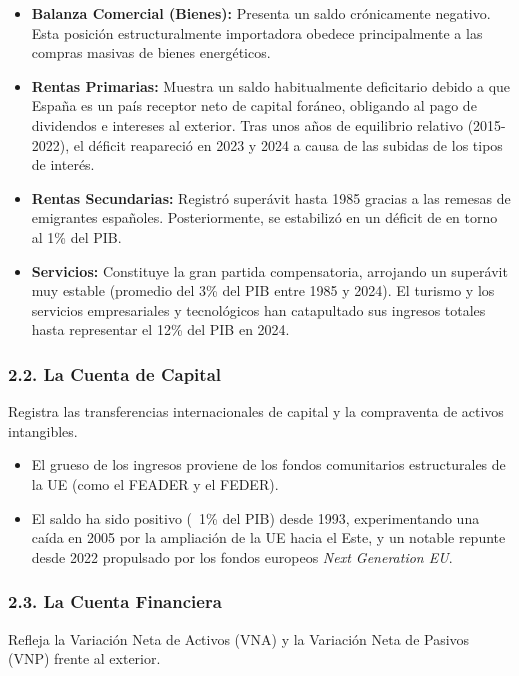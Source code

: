 \begin{itemize}
  \item \textbf{Balanza Comercial (Bienes):} Presenta un saldo crónicamente negativo. Esta posición estructuralmente importadora obedece principalmente a las compras masivas de bienes energéticos.
  \item \textbf{Rentas Primarias:} Muestra un saldo habitualmente deficitario debido a que España es un país receptor neto de capital foráneo, obligando al pago de dividendos e intereses al exterior. Tras unos años de equilibrio relativo (2015-2022), el déficit reapareció en 2023 y 2024 a causa de las subidas de los tipos de interés.
  \item \textbf{Rentas Secundarias:} Registró superávit hasta 1985 gracias a las remesas de emigrantes españoles. Posteriormente, se estabilizó en un déficit de en torno al 1\% del PIB.
  \item \textbf{Servicios:} Constituye la gran partida compensatoria, arrojando un superávit muy estable (promedio del 3\% del PIB entre 1985 y 2024). El turismo y los servicios empresariales y tecnológicos han catapultado sus ingresos totales hasta representar el 12\% del PIB en 2024.
\end{itemize}

\subsubsection*{2.2. La Cuenta de Capital}

Registra las transferencias internacionales de capital y la compraventa de activos intangibles.

\begin{itemize}
  \item El grueso de los ingresos proviene de los fondos comunitarios estructurales de la UE (como el FEADER y el FEDER).
  \item El saldo ha sido positivo (~1\% del PIB) desde 1993, experimentando una caída en 2005 por la ampliación de la UE hacia el Este, y un notable repunte desde 2022 propulsado por los fondos europeos \textit{Next Generation EU}.
\end{itemize}

\subsubsection*{2.3. La Cuenta Financiera}

Refleja la Variación Neta de Activos (VNA) y la Variación Neta de Pasivos (VNP) frente al exterior.

